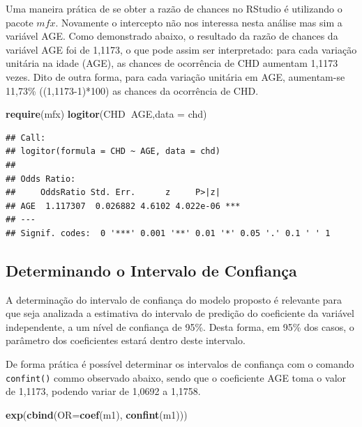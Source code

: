 \documentclass[12pt,brazil,]{book}
\newenvironment{Shaded}{\begin{snugshade}}{\end{snugshade}}
\newcommand{\DataTypeTok}[1]{\textcolor[rgb]{0.13,0.29,0.53}{#1}}
\newcommand{\KeywordTok}[1]{\textcolor[rgb]{0.13,0.29,0.53}{\textbf{#1}}}
\newcommand{\NormalTok}[1]{#1}
\newcommand{\OperatorTok}[1]{\textcolor[rgb]{0.81,0.36,0.00}{\textbf{#1}}}
\begin{document}
Uma maneira prática de se obter a razão de chances no RStudio é
utilizando o pacote \(mfx\). Novamente o intercepto não nos interessa
nesta análise mas sim a variável AGE. Como demonstrado abaixo, o
resultado da razão de chances da variável AGE foi de 1,1173, o que pode
assim ser interpretado: para cada variação unitária na idade (AGE), as
chances de ocorrência de CHD aumentam 1,1173 vezes. Dito de outra forma,
para cada variação unitária em AGE, aumentam-se 11,73\% ((1,1173-1)*100)
as chances da ocorrência de CHD.

\begin{Shaded}
\begin{Highlighting}[]
\KeywordTok{require}\NormalTok{(mfx)}
\KeywordTok{logitor}\NormalTok{(CHD}\OperatorTok{~}\NormalTok{AGE,}\DataTypeTok{data =}\NormalTok{ chd)}
\end{Highlighting}
\end{Shaded}

\begin{verbatim}
## Call:
## logitor(formula = CHD ~ AGE, data = chd)
## 
## Odds Ratio:
##     OddsRatio Std. Err.      z     P>|z|    
## AGE  1.117307  0.026882 4.6102 4.022e-06 ***
## ---
## Signif. codes:  0 '***' 0.001 '**' 0.01 '*' 0.05 '.' 0.1 ' ' 1
\end{verbatim}

\hypertarget{determinando-o-intervalo-de-confianca}{%
\subsection{Determinando o Intervalo de
Confiança}\label{determinando-o-intervalo-de-confianca}}

A determinação do intervalo de confiança do modelo proposto é relevante
para que seja analizada a estimativa do intervalo de predição do
coeficiente da variável independente, a um nível de confiança de 95\%.
Desta forma, em 95\% dos casos, o parâmetro dos coeficientes estará
dentro deste intervalo.

De forma prática é possível determinar os intervalos de confiança com o
comando \texttt{confint()} commo observado abaixo, sendo que o
coeficiente AGE toma o valor de 1,1173, podendo variar de 1,0692 a
1,1758.

\begin{Shaded}
\begin{Highlighting}[]
\KeywordTok{exp}\NormalTok{(}\KeywordTok{cbind}\NormalTok{(}\DataTypeTok{OR=}\KeywordTok{coef}\NormalTok{(m1), }\KeywordTok{confint}\NormalTok{(m1)))}
\end{Highlighting}
\end{Shaded}
\end{document}
